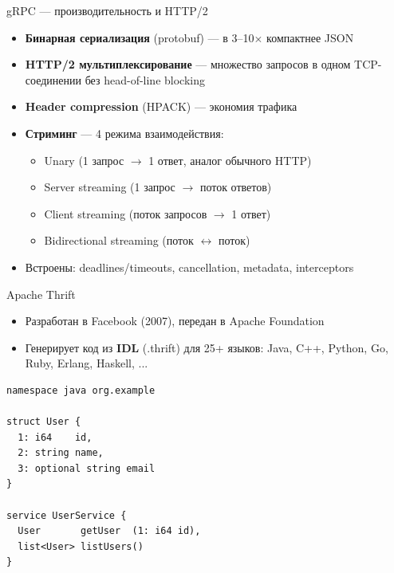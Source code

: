 \documentclass{beamer}
\begin{document}
\begin{frame}{gRPC --- производительность и HTTP/2}
\begin{itemize}
  \item \textbf{Бинарная сериализация} (protobuf) --- в 3--10$\times$ компактнее JSON
  \item \textbf{HTTP/2 мультиплексирование} --- множество запросов в одном TCP-соединении без head-of-line blocking
  \item \textbf{Header compression} (HPACK) --- экономия трафика
  \item \textbf{Стриминг} --- 4 режима взаимодействия:
  \begin{itemize}
    \item Unary (1 запрос $\to$ 1 ответ, аналог обычного HTTP)
    \item Server streaming (1 запрос $\to$ поток ответов)
    \item Client streaming (поток запросов $\to$ 1 ответ)
    \item Bidirectional streaming (поток $\leftrightarrow$ поток)
  \end{itemize}
  \item Встроены: deadlines/timeouts, cancellation, metadata, interceptors
\end{itemize}
\end{frame}

\begin{frame}[fragile]{Apache Thrift}
\begin{itemize}
  \item Разработан в Facebook (2007), передан в Apache Foundation
  \item Генерирует код из \textbf{IDL} (.thrift) для 25+ языков: Java, C++, Python, Go, Ruby, Erlang, Haskell, ...
\end{itemize}
\begin{verbatim}
namespace java org.example

struct User {
  1: i64    id,
  2: string name,
  3: optional string email
}

service UserService {
  User       getUser  (1: i64 id),
  list<User> listUsers()
}
\end{verbatim}
\end{frame}
\end{document}
